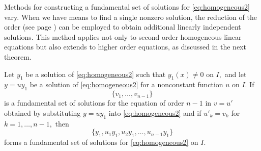 Methods for constructing a fundamental set of solutions for  \eqref{eq:homogeneous2} vary. When we have means to find a single nonzero solution,  the reduction of the order (see page \pageref{page:reduction-of-order}) can be employed to obtain additional linearly independent solutions.  This method applies not only to second order  homogeneous linear equations but also extends to higher order equations, as discussed in the next theorem.

\begin{theorem}
	Let $y_1$ be a  solution of \eqref{eq:homogeneous2} such that \(y_1(x)\ne 0\) on $I,$  and let $y = u y_1$ be a solution of \eqref{eq:homogeneous2} for a nonconstant function $u$  on $I.$ If \[\{v_1, \dots, v_{n-1}\}\] is a fundamental set of solutions for  the equation  of  order $n-1$ in $v=u'$ obtained by substituting $ y= u y_1$ into \eqref{eq:homogeneous2} and if $u'_k= v_k$ for $k = 1, \dots, n-1,$  then 
	\[\{y_1, u_1y_1, u_2y_1, \dots, u_{n-1}y_1\}\] forms a fundamental set of solutions for  \eqref{eq:homogeneous2} on $I.$
\end{theorem}

